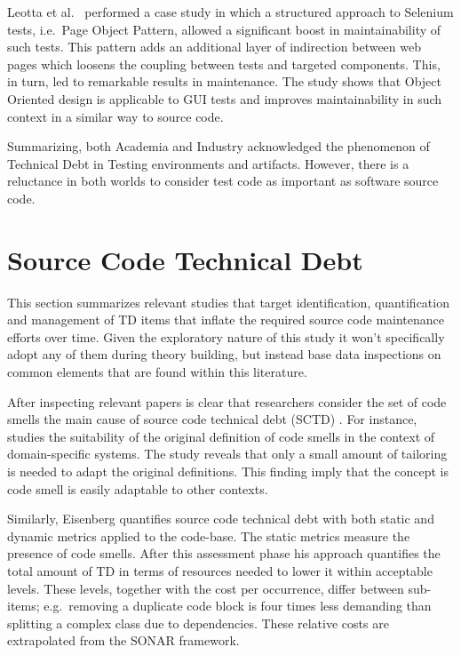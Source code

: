Leotta et al.\ \cite{pageObjectPattern} performed a case study in which a structured approach to Selenium tests, i.e.\ Page Object Pattern, allowed a significant boost in maintainability of such tests. This pattern adds an additional layer of indirection between web pages which loosens the coupling between tests and targeted components. This, in turn, led to remarkable results in maintenance. The study shows that Object Oriented design is applicable to GUI tests and improves maintainability in such context in a similar way to source code.

Summarizing, both Academia and Industry acknowledged the phenomenon of Technical Debt in Testing environments and artifacts. However, there is a reluctance in both worlds to consider test code as important as software source code.

\section{Source Code Technical Debt} \label{source_code_technical_debt}

This section summarizes relevant studies that target identification, quantification and management of TD items that inflate the required source code maintenance efforts over time. Given the exploratory nature of this study it won't specifically adopt any of them during theory building, but instead base data inspections on common elements that are found within this literature.

After inspecting relevant papers is clear that researchers consider the set of code smells \cite{code_smell_definition} the main cause of source code technical debt (SCTD) \cite{mapping_study_td}. For instance, \cite{domain_specific_code_smells} studies the suitability of the original definition of code smells in the context of domain-specific systems. The study reveals that only a small amount of tailoring is needed to adapt the original definitions. This finding imply that the concept is code smell is easily adaptable to other contexts. 

Similarly, Eisenberg \cite{threshold_approach_to_td} quantifies source code technical debt with both static and dynamic metrics applied to the code-base. The static metrics measure the presence of code smells. After this assessment phase his approach quantifies the total amount of TD in terms of resources needed to lower it within acceptable levels. These levels, together with the cost per occurrence, differ between sub-items; e.g.\ removing a duplicate code block is four times less demanding than splitting a complex class due to dependencies. These relative costs are extrapolated from the SONAR \cite{sonar_evaluate_td} framework.

